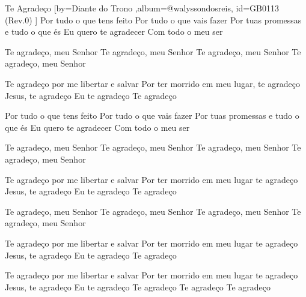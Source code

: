 \beginsong
{Te Agradeço %
}[by={Diante do Trono %
},album={@walyssondosreis},
id={GB0113 %
(Rev.0) %
}]
Por tudo o que tens feito
Por tudo o que vais fazer
Por tuas promessas e tudo o que és
Eu quero te agradecer
Com todo o meu ser

Te agradeço, meu Senhor
Te agradeço, meu Senhor
Te agradeço, meu Senhor
Te agradeço, meu Senhor

Te agradeço por me libertar e salvar
Por ter morrido em meu lugar, te agradeço
Jesus, te agradeço
Eu te agradeço
Te agradeço

Por tudo o que tens feito
Por tudo o que vais fazer
Por tuas promessas e tudo o que és
Eu quero te agradecer
Com todo o meu ser

Te agradeço, meu Senhor
Te agradeço, meu Senhor
Te agradeço, meu Senhor
Te agradeço, meu Senhor

Te agradeço por me libertar e salvar
Por ter morrido em meu lugar te agradeço
Jesus, te agradeço
Eu te agradeço
Te agradeço

Te agradeço, meu Senhor
Te agradeço, meu Senhor
Te agradeço, meu Senhor
Te agradeço, meu Senhor

Te agradeço por me libertar e salvar
Por ter morrido em meu lugar te agradeço
Jesus, te agradeço
Eu te agradeço
Te agradeço

Te agradeço por me libertar e salvar
Por ter morrido em meu lugar te agradeço
Jesus, te agradeço
Eu te agradeço
Te agradeço
Te agradeço
Te agradeço


